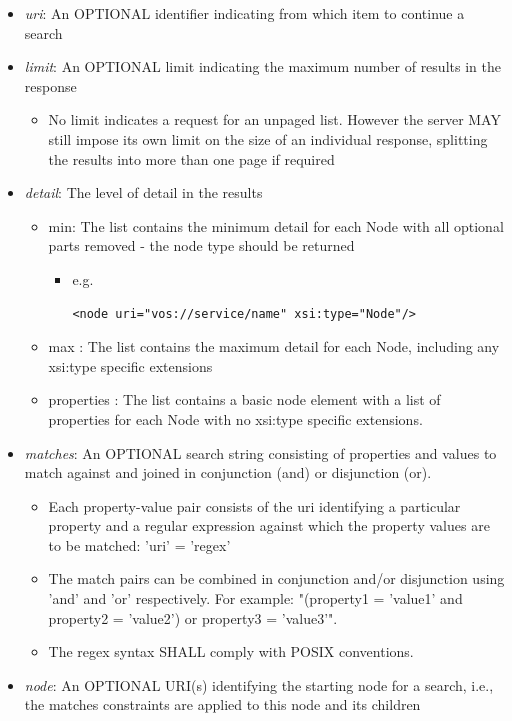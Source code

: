 \documentclass[11pt,a4paper]{ivoa}
\begin{document}
\begin{itemize}
    \item \emph{uri}: An OPTIONAL identifier indicating from which item to continue a search
    \item \emph{limit}: An OPTIONAL limit indicating the maximum number of results in the response
        \begin{itemize}
            \item No limit indicates a request for an unpaged list. However the server MAY still impose its own limit on the size of an individual response, splitting the results into more than one page if required
        \end{itemize}
    \item \emph{detail}: The level of detail in the results
        \begin{itemize}
            \item min: The list contains the minimum detail for each Node with all optional parts removed - the node type should be returned
                \begin{itemize}
                    \item e.g. \begin{verbatim}<node uri="vos://service/name" xsi:type="Node"/>\end{verbatim}
                \end{itemize}
            \item max : The list contains the maximum detail for each Node, including any xsi:type specific extensions
            \item properties : The list contains a basic node element with a list of properties for each Node with no xsi:type specific extensions.
        \end{itemize}
    \item \emph{matches}: An OPTIONAL search string consisting of properties and values to match against and joined in conjunction (and) or disjunction (or).
        \begin{itemize}
            \item Each property-value pair consists of the uri identifying a particular property and a regular expression against which the property values are to be matched: 'uri' = 'regex'
            \item The match pairs can be combined in conjunction and/or disjunction using 'and' and 'or' respectively. For example: "(property1 = 'value1' and property2 = 'value2') or property3 = 'value3'".
            \item The regex syntax SHALL comply with POSIX conventions.
        \end{itemize}
    \item \emph{node}: An OPTIONAL URI(s) identifying the starting node for a search, i.e., the matches constraints are applied to this node and its children
\end{itemize}
\end{document}
